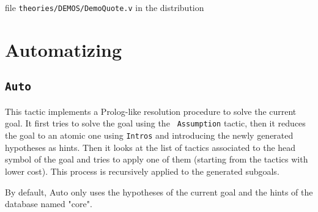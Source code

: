 \SeeAlso file \texttt{theories/DEMOS/DemoQuote.v} in the distribution

\section{Automatizing}
\label{Automatizing}

\subsection{\tt Auto}
This tactic implements a Prolog-like resolution procedure to solve the
current goal. It first tries to solve the goal using the {\tt
  Assumption} tactic, then it reduces the goal to an atomic one using
{\tt Intros} and introducing the newly generated hypotheses as hints.
Then it looks at the list of tactics associated to the head symbol of
the goal and tries to apply one of them (starting from the tactics
with lower cost). This process is recursively applied to the generated
subgoals. 

By default, Auto only uses the hypotheses of the current goal and the
hints of the database named "core". 


